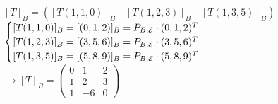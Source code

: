 \begin{enumerate}
            \begin{mdframed}[style=s]
                \begin{center}
                    $[T]_B=\left([T(1,1,0)]_B\quad[T(1,2,3)]_B\quad[T(1,3,5)]_B\right)$\\
                    $\begin{cases}
                        [T(1,1,0)]_B=[(0,1,2)]_B=P_{B,\mathcal{E}}\cdot(0,1,2)^T\\
                        [T(1,2,3)]_B=[(3,5,6)]_B=P_{B,\mathcal{E}}\cdot(3,5,6)^T\\
                        [T(1,3,5)]_B=[(5,8,9)]_B=P_{B,\mathcal{E}}\cdot(5,8,9)^T
                    \end{cases}$\\
                    $\to [T]_B=\begin{pmatrix}
                        0&1&2\\1&2&3\\1&-6&0
                    \end{pmatrix}$
                \end{center}
            \end{mdframed}
    \end{enumerate}